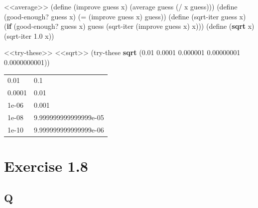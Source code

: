 \documentclass[
]{article}
\newenvironment{Shaded}{}{}
\newcommand{\ExtensionTok}[1]{#1}
\newcommand{\FloatTok}[1]{\textcolor[rgb]{0.25,0.63,0.44}{#1}}
\newcommand{\FunctionTok}[1]{\textcolor[rgb]{0.02,0.16,0.49}{#1}}
\newcommand{\KeywordTok}[1]{\textcolor[rgb]{0.00,0.44,0.13}{\textbf{#1}}}
\newcommand{\NormalTok}[1]{#1}
\newcommand{\OperatorTok}[1]{\textcolor[rgb]{0.40,0.40,0.40}{#1}}
\begin{document}
\hypertarget{sqrt}{%
\label{sqrt}}%
\begin{Shaded}
\begin{Highlighting}[numbers=left,,]
\NormalTok{\textless{}\textless{}average\textgreater{}\textgreater{}}
\NormalTok{(}\ExtensionTok{define}\FunctionTok{ }\NormalTok{(improve guess x)}
\NormalTok{  (average guess (}\OperatorTok{/}\NormalTok{ x guess)))}
\NormalTok{(}\ExtensionTok{define}\FunctionTok{ }\NormalTok{(good{-}enough? guess x)}
\NormalTok{   (}\OperatorTok{=}\NormalTok{ (improve guess x) guess))}
\NormalTok{(}\ExtensionTok{define}\FunctionTok{ }\NormalTok{(sqrt{-}iter guess x)}
\NormalTok{  (}\KeywordTok{if}\NormalTok{ (good{-}enough? guess x)}
\NormalTok{      guess}
\NormalTok{      (sqrt{-}iter (improve guess x) x)))}
\NormalTok{(}\ExtensionTok{define}\FunctionTok{ }\NormalTok{(}\KeywordTok{sqrt}\NormalTok{ x)}
\NormalTok{  (sqrt{-}iter }\FloatTok{1.0}\NormalTok{ x))}
\end{Highlighting}
\end{Shaded}

\hypertarget{EX1-7-t3}{%
\label{EX1-7-t3}}%
\begin{Shaded}
\begin{Highlighting}[numbers=left,,]
\NormalTok{\textless{}\textless{}try{-}these\textgreater{}\textgreater{}}
\NormalTok{\textless{}\textless{}sqrt\textgreater{}\textgreater{}}
\NormalTok{(try{-}these }\KeywordTok{sqrt}\NormalTok{ \textquotesingle{}(}\FloatTok{0.01} \FloatTok{0.0001} \FloatTok{0.000001} \FloatTok{0.00000001} \FloatTok{0.0000000001}\NormalTok{))}
\end{Highlighting}
\end{Shaded}

\begin{longtable}[]{@{}ll@{}}
\toprule
\endhead
0.01 & 0.1 \\
0.0001 & 0.01 \\
1e-06 & 0.001 \\
1e-08 & 9.999999999999999e-05 \\
1e-10 & 9.999999999999999e-06 \\
\bottomrule
\end{longtable}

\hypertarget{exercise-1.8}{%
\section{Exercise 1.8}\label{exercise-1.8}}

\hypertarget{q-7}{%
\subsection{Q}\label{q-7}}
\end{document}
